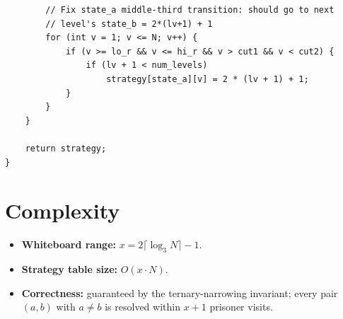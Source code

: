 \documentclass[11pt,a4paper]{article}
\begin{document}
\begin{lstlisting}
        // Fix state_a middle-third transition: should go to next
        // level's state_b = 2*(lv+1) + 1
        for (int v = 1; v <= N; v++) {
            if (v >= lo_r && v <= hi_r && v > cut1 && v < cut2) {
                if (lv + 1 < num_levels)
                    strategy[state_a][v] = 2 * (lv + 1) + 1;
            }
        }
    }

    return strategy;
}
\end{lstlisting}

\section{Complexity}

\begin{itemize}
  \item \textbf{Whiteboard range:} $x = 2\lceil\log_3 N\rceil - 1$.
  \item \textbf{Strategy table size:} $O(x \cdot N)$.
  \item \textbf{Correctness:} guaranteed by the ternary-narrowing
        invariant; every pair $(a,b)$ with $a \ne b$ is resolved within
        $x + 1$ prisoner visits.
\end{itemize}
\end{document}
